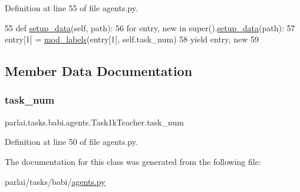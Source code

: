 Definition at line 55 of file agents.\+py.


\begin{DoxyCode}
55     \textcolor{keyword}{def }\hyperlink{namespaceparlai_1_1tasks_1_1multinli_1_1agents_a4fa2cb0ba1ed745336ad8bceed36b841}{setup\_data}(self, path):
56         \textcolor{keywordflow}{for} entry, new \textcolor{keywordflow}{in} super().\hyperlink{namespaceparlai_1_1tasks_1_1multinli_1_1agents_a4fa2cb0ba1ed745336ad8bceed36b841}{setup\_data}(path):
57             entry[1] = \hyperlink{namespaceparlai_1_1tasks_1_1babi_1_1agents_a80ee701751bc608fcb01bcfb1e884de0}{mod\_labels}(entry[1], self.task\_num)
58             \textcolor{keywordflow}{yield} entry, new
59 
\end{DoxyCode}


\subsection{Member Data Documentation}
\mbox{\label{classparlai_1_1tasks_1_1babi_1_1agents_1_1Task1kTeacher_a0c153d5823837de445669016a18540e7}} 
\subsubsection{\texorpdfstring{task\+\_\+num}{task\_num}}
{\footnotesize\ttfamily parlai.\+tasks.\+babi.\+agents.\+Task1k\+Teacher.\+task\+\_\+num}



Definition at line 50 of file agents.\+py.



The documentation for this class was generated from the following file\+:\begin{DoxyCompactItemize}
\item 
parlai/tasks/babi/\hyperlink{parlai_2tasks_2babi_2agents_8py}{agents.\+py}\end{DoxyCompactItemize}
